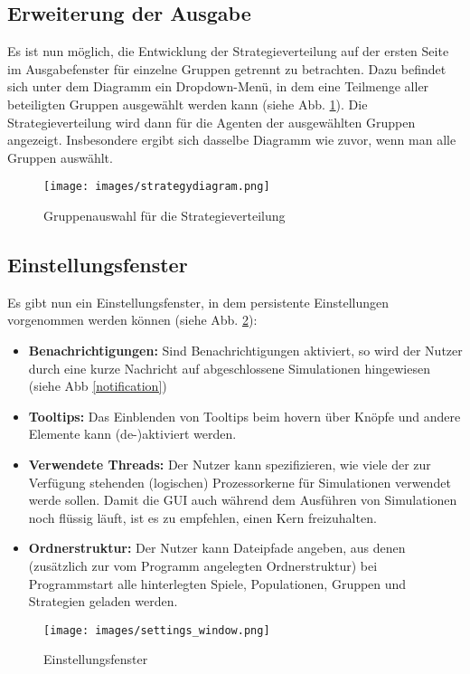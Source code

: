 \documentclass[parskip=full,11pt,openany]{scrreprt}
\begin{document}
\subsection{Erweiterung der Ausgabe}
Es ist nun möglich, die Entwicklung der Strategieverteilung auf der ersten Seite im Ausgabefenster für einzelne Gruppen getrennt zu betrachten. Dazu befindet sich unter dem Diagramm ein Dropdown-Menü, in dem eine Teilmenge aller beteiligten Gruppen ausgewählt werden kann (siehe Abb. \ref{strategydiagram}). Die Strategieverteilung wird dann für die Agenten der ausgewählten Gruppen angezeigt. Insbesondere ergibt sich dasselbe Diagramm wie zuvor, wenn man alle Gruppen auswählt.

\begin{figure}
	\centering
	\texttt{[image: images/strategydiagram.png]}
	\caption{Gruppenauswahl für die Strategieverteilung}
	\label{strategydiagram}
\end{figure}

\subsection{Einstellungsfenster}
Es gibt nun ein Einstellungsfenster, in dem persistente Einstellungen vorgenommen werden können (siehe Abb. \ref{settings_window}):

\begin{itemize}
\item[] \textbf{Benachrichtigungen:} Sind Benachrichtigungen aktiviert, so wird der Nutzer durch eine kurze Nachricht auf abgeschlossene Simulationen hingewiesen (siehe Abb \ref{notification})
\item[] \textbf{Tooltips:} Das Einblenden von Tooltips beim hovern über Knöpfe und andere Elemente kann (de-)aktiviert werden.
\item[] \textbf{Verwendete Threads:} Der Nutzer kann spezifizieren, wie viele der zur Verfügung stehenden (logischen) Prozessorkerne für Simulationen verwendet werde sollen. Damit die GUI auch während dem Ausführen von Simulationen noch flüssig läuft, ist es zu empfehlen, einen Kern freizuhalten.
\item[] \textbf{Ordnerstruktur:} Der Nutzer kann Dateipfade angeben, aus denen (zusätzlich zur vom Programm angelegten Ordnerstruktur) bei Programmstart alle hinterlegten Spiele, Populationen, Gruppen und Strategien geladen werden.
\end{itemize}

\begin{figure}
	\centering
	\texttt{[image: images/settings\_window.png]}
	\caption{Einstellungsfenster}
	\label{settings_window}
\end{figure}
\end{document}
